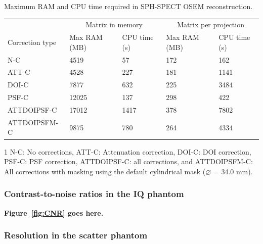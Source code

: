 \documentclass[utf8]{FrontiersinVancouver}
\begin{document}
\begin{threeparttable}[ht!]
\caption{Maximum RAM and CPU time required in SPH-SPECT OSEM reconstruction.\label{tab:computation_cost}}
\footnotesize
\begin{tabular}{l l l l l}
	\hline
	 & \multicolumn{2}{c}{Matrix in memory} & \multicolumn{2}{c}{Matrix per projection} \\ \cline{2-5}
	 Correction type\footnotemark[1] & Max RAM (MB) & CPU time (s) & Max RAM (MB) & CPU time (s) \\ \hline
	 
	 N-C & 4519 & 57 & 172 & 162 \\
	 
	 ATT-C & 4528 & 227 & 181 & 1141 \\
	 
	 DOI-C & 7877 & 632 & 225 & 3484 \\
	 
	 PSF-C & 12025 & 137 & 298 & 422 \\
	 
	 ATTDOIPSF-C & 17012 & 1417 & 378 & 7802 \\
	 
	 ATTDOIPSFM-C & 9875 & 780 & 264 & 4334 \\ \hline
	
\end{tabular}
\begin{tablenotes}
	\item[1]N-C: No corrections, ATT-C: Attenuation correction, DOI-C: DOI correction, PSF-C: PSF correction, ATTDOIPSF-C: all corrections, and ATTDOIPSFM-C: All corrections with masking using the default cylindrical mask ($\diameter$ = 34.0 mm).
\end{tablenotes}
\end{threeparttable}

\subsubsection{Contrast-to-noise ratios in the IQ phantom}



\noindent \textbf{Figure~\ref{fig:CNR} goes here.}

\subsubsection{Resolution in the scatter phantom}
\end{document}
